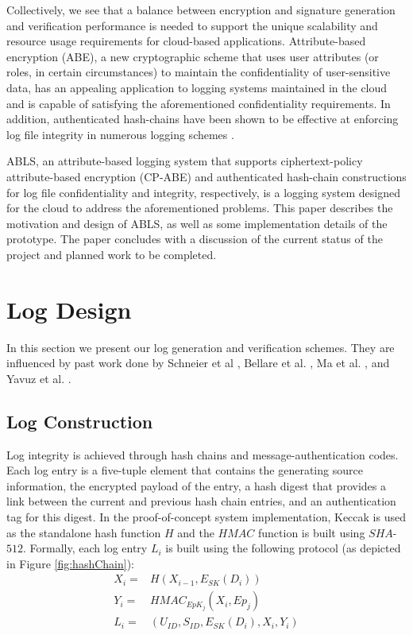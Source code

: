 \documentclass{sig-alternate}
\begin{document}
Collectively, we see that a balance between encryption and signature generation and verification performance is
needed to support the unique scalability and resource usage requirements for cloud-based applications.
Attribute-based encryption (ABE), a new cryptographic scheme that uses user attributes (or roles, in certain 
circumstances) to maintain the confidentiality of user-sensitive data, has an appealing application
to logging systems maintained in the cloud and is capable of satisfying the aforementioned confidentiality 
requirements. In addition, authenticated hash-chains have been shown to be effective at enforcing log file integrity
in numerous logging schemes  \cite{Schneier1999-Secure}. 

ABLS, an attribute-based logging system that supports 
ciphertext-policy attribute-based encryption (CP-ABE) 
\cite{Bethencourt2007-CPABE} and authenticated hash-chain constructions for log file confidentiality and integrity, 
respectively, is a logging system designed for the cloud to address the aforementioned problems. This paper
describes the motivation and design of ABLS, as well as some implementation details of the prototype. The paper
concludes with a discussion of the current status of the project and planned work to be completed.

\section{Log Design}
In this section we present our log generation and verification schemes.
They are influenced by past work done by Schneier et al \cite{Schneier1999-Secure},
Bellare et al. \cite{Bellare1997-ForwardIntegrity}, Ma et al. \cite{Ma2008-FssAgg},
and Yavuz et al. \cite{Yavuz2009-BAF}. 

\subsection{Log Construction}
\label{sec:LogConstruction}

Log integrity is achieved through hash chains and message-authentication codes. 
Each log entry is a five-tuple element that contains the generating source
information, the encrypted payload of the entry, a hash digest that provides
a link between the current and previous hash chain entries, and an authentication tag for this digest. In the proof-of-concept
system implementation, Keccak is used as the standalone hash function $H$
and the $HMAC$ function is built using $SHA$-$512$. 
Formally, each log entry $L_i$ is built using the following protocol (as depicted in Figure \ref{fig:hashChain}):
\begin{align*}
X_i = & H(X_{i - 1}, E_{SK}(D_i)) \\ %
Y_i = & HMAC_{EpK_{j}}(X_i, Ep_{j}) \\ %
L_i = & (U_{ID}, S_{ID}, E_{SK}(D_i), X_i, Y_i) %
\end{align*}
\end{document}
